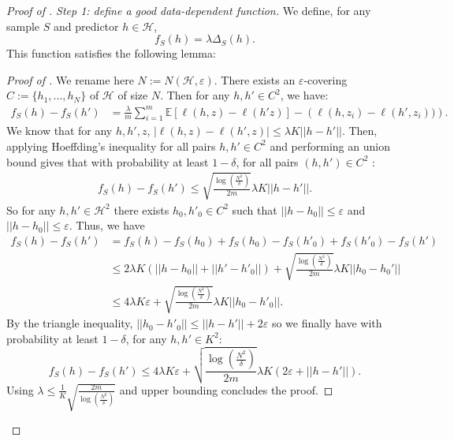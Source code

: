 \begin{proof}[Proof of ]

\textit{Step 1: define a good data-dependent function.} We define, for any sample $S$ and predictor $h\in \mathcal{H}$,
\[ f_S(h) = \lambda \Delta_S(h). \]
This function satisfies the following lemma:
\begin{proof}[Proof of ]
We rename here $N:= N(\mathcal{H},\varepsilon)$. There exists an $\varepsilon$-covering $C:=\{h_1,...,h_N\}$ of $\mathcal{H}$ of size $N$.
Then for any $h,h'\in C^2$, we have:
\begin{align*}
f_S(h)-f_S(h')  & = \frac{\lambda}{m}\sum_{i=1}^m \mathbb{E}[\ell(h,z)-\ell(h'z)] - \left(\ell(h,z_i)-\ell(h',z_i))\right).
\end{align*}
We know that for any $h,h',z$, $|\ell(h,z)-\ell(h',z)| \leq \lambda K||h-h'||$. Then, applying Hoeffding's inequality for all pairs $h,h'\in C^2$ and performing an union bound gives that with probability at least $1-\delta$, for all pairs $(h,h')\in C^2$ :
\begin{align*}
f_S(h)-f_S(h')  \leq \sqrt{\frac{\log\left(\frac{N^2}{\delta}\right)}{2m}} \lambda K ||h-h'||.
\end{align*}
So for any $h,h'\in \mathcal{H}^2$ there exists $h_0,h'_0\in C^2$ such that $||h-h_0||\leq \varepsilon$ and $||h-h_0||\leq \varepsilon$. Thus, we have
\begin{align*}
f_S(h)-f_S(h')  & = f_S(h)-f_S(h_0) + f_S(h_0)-f_S(h'_0)+ f_S(h'_0)-f_S(h') \\
& \leq 2\lambda K \left(||h-h_0|| + ||h'-h'_0||\right) + \sqrt{\frac{\log\left(\frac{N^2}{\delta}\right)}{2m}} \lambda K ||h_0-h_0'|| \\
& \leq 4\lambda K \varepsilon + \sqrt{\frac{\log\left(\frac{N^2}{\delta}\right)}{2m}} \lambda K ||h_0-h'_0||.
\end{align*}
By the triangle inequality, $||h_0-h'_0||\leq ||h-h'|| + 2\varepsilon$ so we finally have with probability at least $1-\delta$, for any $h,h'\in K^2$:
\[  f_S(h)-f_S(h') \leq 4\lambda K \varepsilon + \sqrt{\frac{\log\left(\frac{N^2}{\delta}\right)}{2m}} \lambda K \left( 2\varepsilon+ ||h-h'||\right).\]
Using $\lambda \leq \frac{1}{K}\sqrt{\frac{2m}{\log\left(\frac{N^2}{\delta}\right)}}$ and upper bounding concludes the proof.
\end{proof}


\end{proof}
